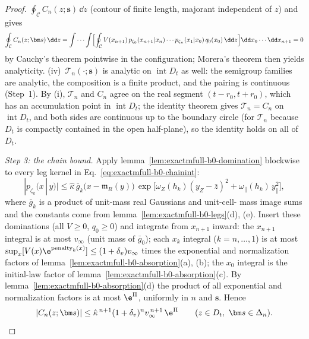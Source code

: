 \begin{proof}
\(\oint_{\mathcal C}C_n(z;\bm s)\,\dd z\) (contour of finite length,
majorant independent of \(z\)) and gives
\begin{equation*}
 \oint_{\mathcal C}C_n(z;\bm s)\,\dd z
 =\idotsint
 \Bigl[\oint_{\mathcal C}
 V(x_{n+1})\,p_{\zeta_0}(x_{n+1}|x_n)\cdots
 p_{\zeta_n}(x_1|x_0)\,q_0(x_0)\,\dd z\Bigr]
 \dd x_0\cdots\dd x_{n+1}
 =0
\end{equation*}
by Cauchy's theorem pointwise in the configuration; Morera's theorem then
yields analyticity.
(iv)~\(\mathcal T_n(\cdot;\bm s)\) is analytic on
\(\operatorname{int}D_t\) as well: the semigroup families are analytic, the
composition is a finite product, and the pairing is continuous (Step~1).
By (i), \(\mathcal T_n\) and \(C_n\) agree on the real segment
\((t-r_0,t+r_0)\), which has an accumulation point in
\(\operatorname{int}D_t\); the identity theorem gives
\(\mathcal T_n=C_n\) on \(\operatorname{int}D_t\), and both sides are
continuous up to the boundary circle (for \(\mathcal T_n\) because
\(D_t\) is compactly contained in the open half-plane), so the identity
holds on all of \(D_t\).

\emph{Step 3: the chain bound.}
Apply lemma~\ref{lem:exactmfull-b0-domination} blockwise to every leg
kernel in Eq.~\eqref{eq:exactmfull-b0-chainint}:
\begin{equation*}
 |p_{\zeta_k}(x\,|\,y)|
 \le\hat\kappa\,\bar g_k\bigl(x-\mathfrak m_R(y)\bigr)\,
 \exp\!\bigl[\omega_Z(h_k)(y_Z-\bar z)^2
 +\omega_\parallel(h_k)\,y_\parallel^2\bigr],
\end{equation*}
where \(\bar g_k\) is a product of unit-mass real Gaussians and unit-cell-%
mass image sums and the constants come from
lemma~\ref{lem:exactmfull-b0-legs}(d), (e).  Insert these dominations (all
\(V\ge0\), \(q_0\ge0\)) and integrate from \(x_{n+1}\) inward: the
\(x_{n+1}\) integral is at most \(v_\infty\) (unit mass of
\(\bar g_0\)); each \(x_k\) integral (\(k=n,\ldots,1\)) is at most
\(\sup_x[V(x)\e^{\text{penalty}_k(x)}]\le(1+\delta_v)v_\infty\) times the
exponential and normalization factors of
lemma~\ref{lem:exactmfull-b0-absorption}(a), (b); the \(x_0\) integral is
the initial-law factor of lemma~\ref{lem:exactmfull-b0-absorption}(c).  By
lemma~\ref{lem:exactmfull-b0-absorption}(d) the product of all exponential
and normalization factors is at most \(\e^{\Pi}\), uniformly in \(n\) and
\(\bm s\).  Hence
\begin{equation}
 |C_n(z;\bm s)|
 \le\hat\kappa^{\,n+1}(1+\delta_v)^n v_\infty^{\,n+1}\,\e^{\Pi}
 \qquad(z\in D_t,\ \bm s\in\Delta_n).
 \label{eq:exactmfull-b0-chainbound}
\end{equation}


\end{proof}
